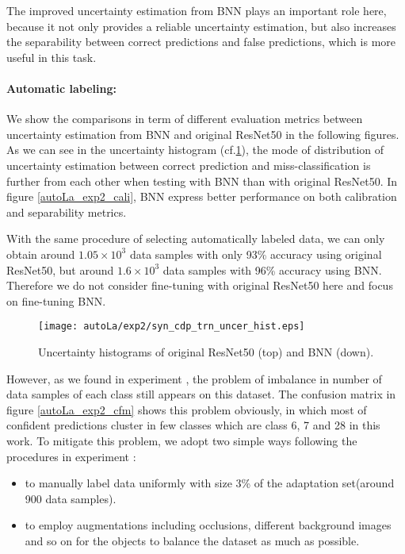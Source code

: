 The improved uncertainty estimation from BNN plays an important role here, because it not only provides a reliable uncertainty estimation, but also increases the separability between correct predictions and false predictions, which is more useful in this task. 

\paragraph{Automatic labeling:}
We show the comparisons in term of different evaluation metrics between uncertainty estimation from BNN and original ResNet50 in the following figures. As we can see in the uncertainty histogram (cf.\ref{autoLa_exp2_hist}), the mode of distribution of uncertainty estimation between correct prediction and miss-classification is further from each other when testing with BNN than with original ResNet50. In figure \ref{autoLa_exp2_cali}, BNN express better performance on both calibration and separability metrics. 

With the same procedure of selecting automatically labeled data, we can only obtain around $1.05\times10^3$ data samples with only 93\% accuracy using original ResNet50, but around $1.6\times10^3$ data samples with 96\% accuracy using BNN. Therefore we do not consider fine-tuning with original ResNet50 here and focus on fine-tuning BNN.

\begin{figure}[h!]
	\begin{center}
		\texttt{[image: autoLa/exp2/syn\_cdp\_trn\_uncer\_hist.eps]}
		\caption{Uncertainty histograms of original ResNet50 (top) and BNN (down).}		
		\label{autoLa_exp2_hist}
	\end{center}
\end{figure}
However, as we found in experiment , the problem of imbalance in number of data samples of each class still appears on this dataset. The confusion matrix in figure \ref{autoLa_exp2_cfm} shows this problem obviously, in which most of confident predictions cluster in few classes which are class 6, 7 and 28 in this work. To mitigate this problem, we adopt two simple ways following the procedures in experiment :
\begin{itemize}
\item to manually label data uniformly with size 3\% of the adaptation set(around 900 data samples).
\item to employ augmentations including occlusions, different background images and so on for the objects to balance the dataset as much as possible.  
\end{itemize} 

